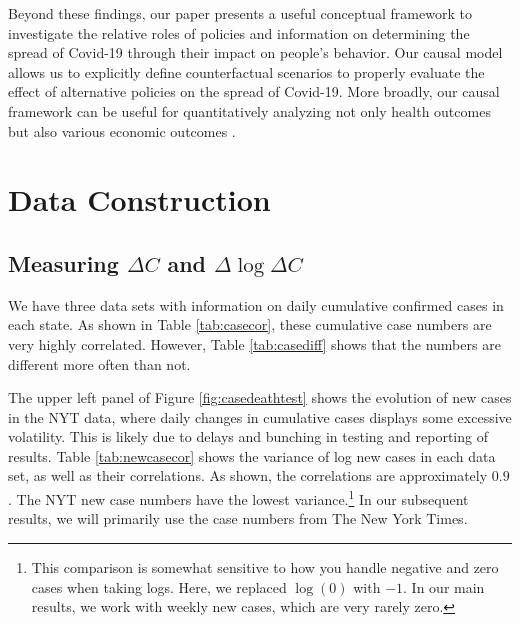 \documentclass[11pt,reqno,letter]{amsart}
\theoremstyle{definition}
\begin{document}
Beyond these findings, our paper presents a useful conceptual framework to investigate the relative roles of policies and information on determining the spread of Covid-19 through their impact on people's behavior. Our causal model allows us  to explicitly define counterfactual scenarios to properly evaluate the effect of alternative policies on the spread of Covid-19. %
 More broadly, our  causal framework can be useful for quantitatively analyzing not only health outcomes but also various economic outcomes \citep{bartik2020, chetty2020real}.





\FloatBarrier

\begin{footnotesize}




\end{footnotesize}


\newpage

\appendix

\section{Data Construction}


\subsection{Measuring $\Delta C$ and $\Delta\log \Delta C$}

We have three data sets with information on daily cumulative confirmed
cases in each state. As shown in Table \ref{tab:casecor}, these
cumulative case numbers are very highly correlated. However, Table
\ref{tab:casediff} shows that the numbers are different more often
than not.






The upper left panel of Figure \ref{fig:casedeathtest} shows the evolution of new cases in the NYT data, where daily changes in cumulative
cases displays some excessive volatility. This is likely due to delays
and bunching in testing and reporting of results.
Table
\ref{tab:newcasecor} shows the variance of log new cases in each data
set, as well as their correlations. As shown, the correlations are
approximately $0.9$. The NYT new case
numbers have the lowest variance.\footnote{This comparison is somewhat
  sensitive to how you handle negative and zero cases when taking
  logs. Here, we replaced $\log(0)$ with $-1$. In our main
  results, we work with weekly new cases, which are very rarely zero.}
In our subsequent results, we will primarily use the case numbers from
The New York Times.
\end{document}
